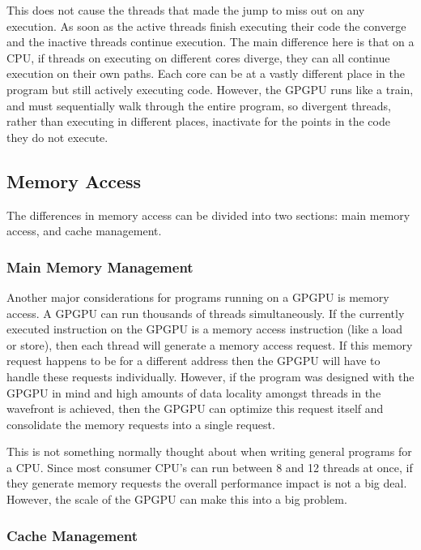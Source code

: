 This does not cause the threads that made the jump to miss out on any execution. As soon as the active threads finish executing their code the converge and the inactive threads continue execution. The main difference here is that on a CPU, if threads on executing on different cores diverge, they can all continue execution on their own paths. Each core can be at a vastly different place in the program but still actively executing code. However, the GPGPU runs like a train, and must sequentially walk through the entire program, so divergent threads, rather than executing in different places, inactivate for the points in the code they do not execute. \cite{memcached}

\subsection*{Memory Access}

The differences in memory access can be divided into two sections: main memory access, and cache management. 

\subsubsection*{Main Memory Management}

Another major considerations for programs running on a GPGPU is memory access. A GPGPU can run thousands of threads simultaneously. If the currently executed instruction on the GPGPU is a memory access instruction (like a load or store), then each thread will generate a memory access request. If this memory request happens to be for a different address then the GPGPU will have to handle these requests individually. However, if the program was designed with the GPGPU in mind and high amounts of data locality amongst threads in the wavefront is achieved, then the GPGPU can optimize this request itself and consolidate the memory requests into a single request. \cite{memcached, tlpcache}

This is not something normally thought about when writing general programs for a CPU. Since most consumer CPU's can run between 8 and 12 threads at once, if they generate memory requests the overall performance impact is not a big deal. However, the scale of the GPGPU can make this into a big problem. \cite{memcached}

\subsubsection*{Cache Management}

